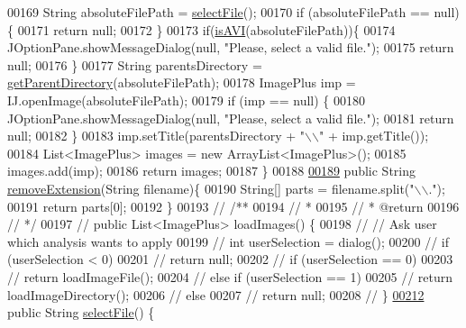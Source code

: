 \begin{DoxyCode}
00169     String absoluteFilePath = \hyperlink{classfunctions_1_1_file_manager_aa741a9e7ac4127ae1a463fb626474edf}{selectFile}();
00170     \textcolor{keywordflow}{if} (absoluteFilePath == null) \{
00171       \textcolor{keywordflow}{return} null;
00172     \}
00173     \textcolor{keywordflow}{if}(\hyperlink{classfunctions_1_1_file_manager_aef15c5bfadc70a7333a3103e85e7bf65}{isAVI}(absoluteFilePath))\{
00174       JOptionPane.showMessageDialog(null, \textcolor{stringliteral}{"Please, select a valid file."});
00175       \textcolor{keywordflow}{return} null;
00176     \}
00177     String parentsDirectory = \hyperlink{classfunctions_1_1_file_manager_aa9e15d838c5a7a0e3906d9ceec253398}{getParentDirectory}(absoluteFilePath);
00178     ImagePlus imp = IJ.openImage(absoluteFilePath);
00179     \textcolor{keywordflow}{if} (imp == null) \{
00180       JOptionPane.showMessageDialog(null, \textcolor{stringliteral}{"Please, select a valid file."});
00181       \textcolor{keywordflow}{return} null;
00182     \}
00183     imp.setTitle(parentsDirectory + \textcolor{stringliteral}{"\(\backslash\)\(\backslash\)"} + imp.getTitle());
00184     List<ImagePlus> images = \textcolor{keyword}{new} ArrayList<ImagePlus>();
00185     images.add(imp);
00186     \textcolor{keywordflow}{return} images;
00187   \}
00188   
\hypertarget{_file_manager_8java_source_l00189}{}\hyperlink{classfunctions_1_1_file_manager_a4053142396d8fa1e3d2a2c1974952124}{00189}   \textcolor{keyword}{public} String \hyperlink{classfunctions_1_1_file_manager_a4053142396d8fa1e3d2a2c1974952124}{removeExtension}(String filename)\{
00190     String[] parts = filename.split(\textcolor{stringliteral}{"\(\backslash\)\(\backslash\)."});
00191     \textcolor{keywordflow}{return} parts[0];
00192   \}
00193 \textcolor{comment}{//  /**}
00194 \textcolor{comment}{//   * }
00195 \textcolor{comment}{//   * @return}
00196 \textcolor{comment}{//   */}
00197 \textcolor{comment}{//  public List<ImagePlus> loadImages() \{}
00198 \textcolor{comment}{//    // Ask user which analysis wants to apply}
00199 \textcolor{comment}{//    int userSelection = dialog();}
00200 \textcolor{comment}{//    if (userSelection < 0)}
00201 \textcolor{comment}{//      return null;}
00202 \textcolor{comment}{//    if (userSelection == 0)}
00203 \textcolor{comment}{//      return loadImageFile();}
00204 \textcolor{comment}{//    else if (userSelection == 1)}
00205 \textcolor{comment}{//      return loadImageDirectory();}
00206 \textcolor{comment}{//    else}
00207 \textcolor{comment}{//      return null;}
00208 \textcolor{comment}{//  \}}
\hypertarget{_file_manager_8java_source_l00212}{}\hyperlink{classfunctions_1_1_file_manager_aa741a9e7ac4127ae1a463fb626474edf}{00212} \textcolor{comment}{}  \textcolor{keyword}{public} String \hyperlink{classfunctions_1_1_file_manager_aa741a9e7ac4127ae1a463fb626474edf}{selectFile}() \{

\end{DoxyCode}
